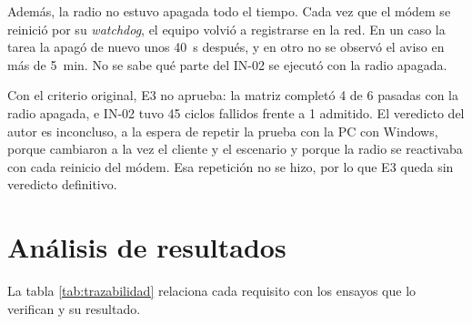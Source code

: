 Además, la radio no estuvo apagada todo el tiempo. Cada vez que el módem se reinició por su \textit{watchdog}, el equipo volvió a registrarse en la red. En un caso la tarea la apagó de nuevo unos 40~s después, y en otro no se observó el aviso en más de 5~min. No se sabe qué parte del IN-02 se ejecutó con la radio apagada.

Con el criterio original, E3 no aprueba: la matriz completó 4 de 6 pasadas con la radio apagada, e IN-02 tuvo 45 ciclos fallidos frente a 1 admitido. El veredicto del autor es inconcluso, a la espera de repetir la prueba con la PC con Windows, porque cambiaron a la vez el cliente y el escenario y porque la radio se reactivaba con cada reinicio del módem. Esa repetición no se hizo, por lo que E3 queda sin veredicto definitivo.


\section{Análisis de resultados}
\label{sec:analisis_resultados}

La tabla \ref{tab:trazabilidad} relaciona cada requisito con los ensayos que lo verifican y su resultado.

